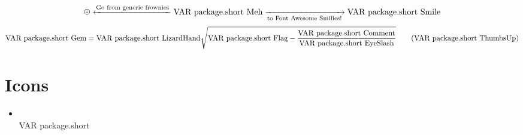\documentclass{article}
\begin{document}
\section{}
\[
\text{\frownie} \xleftarrow{\text{Go from generic frownies}} \text{\\VAR{ package.short }Meh} 
  \xrightarrow[\text{to Font Awesome Smilies!}]{ } \text{\\VAR{ package.short }Smile}
\]
\begin{equation}
\text{\\VAR{ package.short }Gem}={\text{\\VAR{ package.short }LizardHand}}{\sqrt{\text{\\VAR{ package.short }Flag} - \frac{\text{\\VAR{ package.short }Comment}}{\text{\\VAR{ package.short }EyeSlash}}}}
\tag{$\text{\\VAR{ package.short }ThumbsUp}$}
\end{equation}
\section{Icons}
\begin{multicols}{2}
\begin{itemize}
  \item \\VAR{ package.short } \hspace{1em} 
\end{itemize}
\end{multicols}
\end{document}
